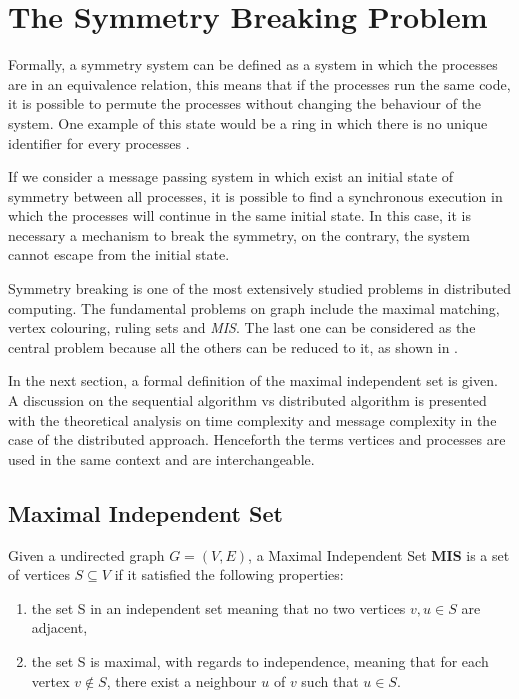 \section{The Symmetry Breaking Problem}
\label{cap:2}

Formally, a symmetry system can be defined as a system in which the processes are in an equivalence relation, this means that if the processes run the same code, it is possible to permute the processes without changing the behaviour of the system. One example of this state would be a ring in which there is no unique identifier for every processes \cite{boldi1996symmetry}. 

If we consider a message passing system in which exist an initial state of symmetry between all processes, it is possible to find a synchronous execution in which the processes will continue in the same initial state. In this case, it is necessary a mechanism to break the symmetry, on the contrary, the system cannot escape from the initial state.

Symmetry breaking is one of the most extensively studied problems in distributed computing. The fundamental problems on graph include the maximal matching, vertex colouring, ruling sets and \textit{MIS}. The last one can be considered as the central problem because all the others can be reduced to it, as shown in  \cite{linial1992locality}.

In the next section, a formal definition of the maximal independent set is given. A  discussion on the sequential algorithm vs distributed algorithm is presented with the theoretical analysis on time complexity and message complexity in the case of the distributed approach. Henceforth the terms vertices and processes are used in the same context and are interchangeable.    

\subsection{Maximal Independent Set}

\theoremstyle{definition}
\begin{definition}

Given a undirected graph $G = (V,E)$, a Maximal Independent Set \textbf{MIS} is a set of vertices $S \subseteq V$ if it satisfied the following properties:   

\begin{enumerate}
  \item the set S in an independent set meaning that no two vertices $v,u \in S$ are adjacent,
  \item the set S is maximal, with regards to independence, meaning that for each vertex $v \notin S$, there exist a neighbour $u$ of $v$ such that $u \in S$.
\end{enumerate}

\end{definition}

